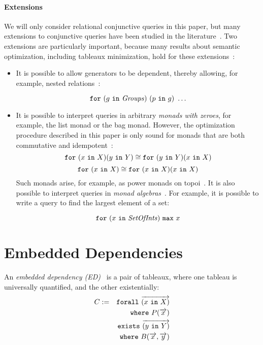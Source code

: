 \documentclass[preprint]{sigplanconf}
\newcommand{\FOR}{{\tt for} \ }
\newcommand{\FORALL}{{\tt forall} \ }
\newcommand{\EXISTS}{{\tt exists} \ }
\newcommand{\WHERE}{{\tt where} \ }
\newcommand{\IN}{ \ {\tt in} \ }
\newcommand{\relation}[1]{\ensuremath{\mathit{#1}}\xspace}
\begin{document}
\paragraph{Extensions}
We will only consider relational conjunctive queries in this paper, but many extensions to conjunctive queries have been studied in the literature~\cite{foundations}.  Two extensions are particularly important, because many results about semantic optimization, including tableaux minimization, hold for these extensions~\cite{Popa99anequational}:
\begin{itemize} 
\item  It is possible to allow generators to be dependent, thereby allowing, for example, nested relations~\cite{Popa99anequational}:
\begin{normalsize}
$$ \FOR (g \IN \relation{Groups}) \ (p \IN g) \ \ldots $$
\end{normalsize}
\item It is possible to interpret queries in arbitrary {\it monads with zeroes}, for example, the list monad or the bag monad.  However, the  optimization procedure described in this paper is only sound for monads that are both commutative and idempotent~\cite{Popa99anequational}:
$$
\FOR (x \IN X)(y \IN Y)  \cong \FOR (y \IN Y) (x \IN X) 
$$
$$
\FOR (x \IN X) \cong \FOR (x \IN X)(x \IN X) 
$$
Such monads arise, for example, as power monads on topoi~\cite{BW}.  It is also possible to interpret queries in {\it monad algebras}~\cite{755736}.  For example, it is possible to write a query to find the largest element of a set: 
\begin{normalsize}
$$ \FOR (x \IN \relation{SetOfInts}) \ {\tt max} \ x $$
\end{normalsize}

\end{itemize}

\section{Embedded Dependencies}
\label{sec:eds}

An {\it embedded dependency (ED)}~\cite{foundations} is a pair of tableaux, where one tableau is universally quantified, and the other existentially:
\begin{eqnarray*}
C & := & \FORALL \overrightarrow{(x \IN X)} \\
 & & \WHERE P(\overrightarrow{x}) \\
 & & \EXISTS \overrightarrow{(y \IN Y)} \\
 & & \WHERE B(\overrightarrow{x}, \overrightarrow{y})
\end{eqnarray*}
\end{document}
